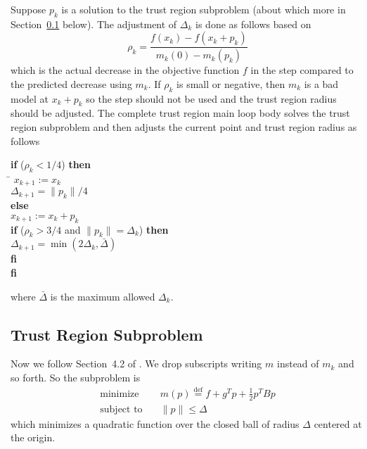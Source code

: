 \documentclass[11pt]{article}
\begin{document}
Suppose $p_k$ is a solution to the trust region subproblem
(about which more in Section~\ref{sec:subproblem} below).
The adjustment of $\Delta_k$ is done as follows
\citep[Algorithm~4.1]{naw} based on
\begin{equation} \label{eq:rhok}
   \rho_k = \frac{f(x_k) - f(x_k + p_k)}{m_k(0) - m_k(p_k)}
\end{equation}
which is the actual decrease in the objective function $f$ in the step
compared to the predicted decrease using $m_k$.  If $\rho_k$ is small
or negative, then $m_k$ is a bad model at $x_k + p_k$ so the step should
not be used and the trust region radius should be adjusted.
The complete trust region main loop body solves the trust region subproblem
and then adjusts the current point and trust region radius as follows
\begin{tabbing}
\textbf{if} ($\rho_k < 1 / 4$) \textbf{then} \\
\qquad \= $x_{k + 1} := x_k$ \\
\> $\Delta_{k + 1} = \lVert p_k \rVert / 4$ \\
\textbf{else} \\
\> $x_{k + 1} := x_k + p_k$ \\
\> \textbf{if} ($\rho_k > 3 / 4$ and $\lVert p_k \rVert = \Delta_k$)
\textbf{then} \\
\> \qquad $\Delta_{k + 1} = \min( 2 \Delta_k, \bar{\Delta} )$ \\
\> \textbf{fi} \\
\textbf{fi}
\end{tabbing}
where $\bar{\Delta}$ is the maximum allowed $\Delta_k$.

\subsection{Trust Region Subproblem} \label{sec:subproblem}

Now we follow Section~4.2 of \citet{naw}.  We drop subscripts
writing $m$ instead of $m_k$ and so forth.  So the subproblem is
\begin{align*}
   \text{minimize} &
   \quad m(p) \stackrel{\text{def}}{=} f + g^T p + \tfrac{1}{2} p^T B p
   \\
   \text{subject to} & \quad \lVert p \lVert \le \Delta
\end{align*}
which minimizes a quadratic function over the closed ball of
radius $\Delta$ centered at the origin.
\end{document}
